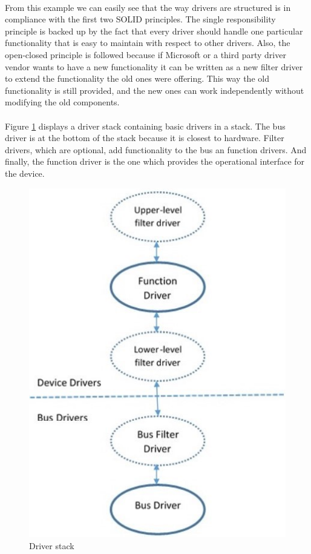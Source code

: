 	   	\paragraph{}
	   	From this example we can easily see that the way drivers are structured is in compliance with the first two SOLID principles. The single responsibility principle is backed up by the fact that every driver should handle one particular functionality that is easy to maintain with respect to other drivers. Also, the open-closed principle is followed because if Microsoft or a third party driver vendor wants to have a new functionality it can be written as a new filter driver to extend the functionality the old ones were offering. This way the old functionality is still provided, and the new ones can work independently without modifying the old components.
	   
	   	\paragraph{}
	   	Figure \ref{fig:driverstack} displays a driver stack containing basic drivers in a stack. The bus driver is at the bottom of the stack because it is closest to hardware. Filter drivers, which are optional, add functionality to the bus an function drivers. And finally, the function driver is the one which provides the operational interface for the device.
	    
	   	\begin{figure}[h!]
	   		\begin{center}
		   		\includegraphics[scale=0.7]{images/DriverStack.jpg}
		   		\caption{Driver stack\cite{WindowsDriverTutorial}}
		   		\label{fig:driverstack}
	   		\end{center}
	   	\end{figure}
	   
